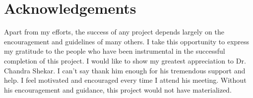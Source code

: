 \chapter*{\centering Acknowledgements}
\quad Apart from my efforts, the success of any project depends largely on the encouragement and guidelines of many others.
I take this opportunity to express my gratitude to the people who have been instrumental in the successful completion of this project.
I would like to show my greatest appreciation to Dr. Chandra Shekar. I can’t say thank him enough for his tremendous support and help.
I feel motivated and encouraged every time I attend his meeting.
Without his encouragement and guidance, this project would not have materialized.